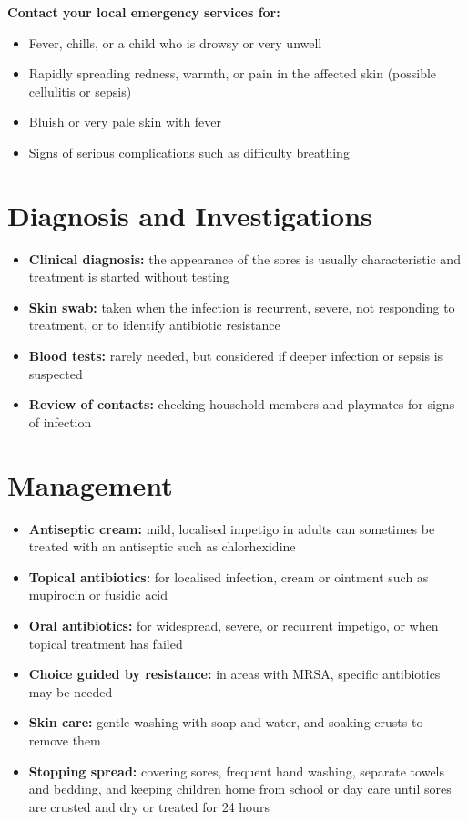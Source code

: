 \textbf{Contact your local emergency services for:}
\begin{itemize}
    \item Fever, chills, or a child who is drowsy or very unwell
    \item Rapidly spreading redness, warmth, or pain in the affected skin (possible cellulitis or sepsis)
    \item Bluish or very pale skin with fever
    \item Signs of serious complications such as difficulty breathing
\end{itemize}

\section*{Diagnosis and Investigations}
\begin{itemize}
    \item \textbf{Clinical diagnosis:} the appearance of the sores is usually characteristic and treatment is started without testing
    \item \textbf{Skin swab:} taken when the infection is recurrent, severe, not responding to treatment, or to identify antibiotic resistance
    \item \textbf{Blood tests:} rarely needed, but considered if deeper infection or sepsis is suspected
    \item \textbf{Review of contacts:} checking household members and playmates for signs of infection
\end{itemize}

\section*{Management}
\begin{itemize}
    \item \textbf{Antiseptic cream:} mild, localised impetigo in adults can sometimes be treated with an antiseptic such as chlorhexidine
    \item \textbf{Topical antibiotics:} for localised infection, cream or ointment such as mupirocin or fusidic acid
    \item \textbf{Oral antibiotics:} for widespread, severe, or recurrent impetigo, or when topical treatment has failed
    \item \textbf{Choice guided by resistance:} in areas with MRSA, specific antibiotics may be needed
    \item \textbf{Skin care:} gentle washing with soap and water, and soaking crusts to remove them
    \item \textbf{Stopping spread:} covering sores, frequent hand washing, separate towels and bedding, and keeping children home from school or day care until sores are crusted and dry or treated for 24 hours
\end{itemize}

